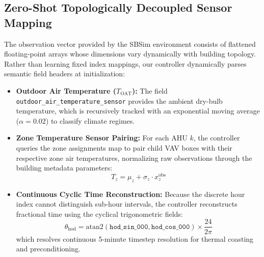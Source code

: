 \documentclass{article}
\begin{document}
\subsection{Zero-Shot Topologically Decoupled Sensor Mapping}
The observation vector provided by the SBSim environment consists of flattened floating-point arrays whose dimensions vary dynamically with building topology. Rather than learning fixed index mappings, our controller dynamically parses semantic field headers at initialization:
\begin{itemize}[leftmargin=*]
    \item \textbf{Outdoor Air Temperature ($T_{\text{OAT}}$):} The field \texttt{outdoor\_air\_temperature\_sensor} provides the ambient dry-bulb temperature, which is recursively tracked with an exponential moving average ($\alpha = 0.02$) to classify climate regimes.
    \item \textbf{Zone Temperature Sensor Pairing:} For each AHU $k$, the controller queries the zone assignments map to pair child VAV boxes with their respective zone air temperatures, normalizing raw observations through the building metadata parameters:
    \begin{equation}
    T_z = \mu_z + \sigma_z \cdot x_z^{\text{obs}}
    \end{equation}
    \item \textbf{Continuous Cyclic Time Reconstruction:} Because the discrete hour index cannot distinguish sub-hour intervals, the controller reconstructs fractional time using the cyclical trigonometric fields:
    \begin{equation}
    \theta_{\text{hod}} = \text{atan2}(\texttt{hod\_sin\_000}, \texttt{hod\_cos\_000}) \times \frac{24}{2\pi}
    \end{equation}
    which resolves continuous 5-minute timestep resolution for thermal coasting and preconditioning.
\end{itemize}
\end{document}
